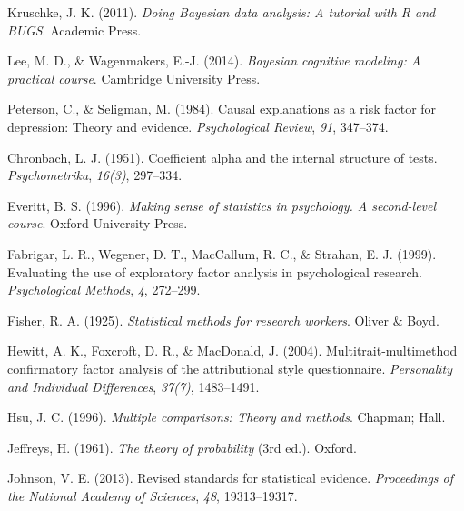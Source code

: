 \documentclass[
  a4paper,
]{book}
\newlength{\cslhangindent}
\newlength{\cslentryspacingunit} %
\newenvironment{CSLReferences}[2] %
 {%
  \setlength{\parindent}{0pt}
  \ifodd #1
  \let\oldpar\par
  \def\par{\hangindent=\cslhangindent\oldpar}
  \fi
  \setlength{\parskip}{#2\cslentryspacingunit}
 }%
 {}
\begin{document}
\begin{CSLReferences}{1}{0}
\leavevmode{}%
Kruschke, J. K. (2011). \emph{Doing {B}ayesian data analysis: A tutorial
with {R} and {BUGS}}. Academic Press.

\leavevmode{}%
Lee, M. D., \& Wagenmakers, E.-J. (2014). \emph{Bayesian cognitive
modeling: A practical course}. Cambridge University Press.

\leavevmode{}%
Peterson, C., \& Seligman, M. (1984). Causal explanations as a risk
factor for depression: Theory and evidence. \emph{Psychological Review},
\emph{91}, 347--374.

\end{CSLReferences}

\hypertarget{refs}{}
\begin{CSLReferences}{1}{0}
\leavevmode{}%
Chronbach, L. J. (1951). Coefficient alpha and the internal structure of
tests. \emph{Psychometrika}, \emph{16(3)}, 297--334.

\leavevmode{}%
Everitt, B. S. (1996). \emph{Making sense of statistics in psychology. A
second-level course}. Oxford University Press.

\leavevmode{}%
Fabrigar, L. R., Wegener, D. T., MacCallum, R. C., \& Strahan, E. J.
(1999). Evaluating the use of exploratory factor analysis in
psychological research. \emph{Psychological Methods}, \emph{4},
272--299.

\leavevmode{}%
Fisher, R. A. (1925). \emph{Statistical methods for research workers}.
Oliver \& Boyd.

\leavevmode{}%
Hewitt, A. K., Foxcroft, D. R., \& MacDonald, J. (2004).
Multitrait-multimethod confirmatory factor analysis of the attributional
style questionnaire. \emph{Personality and Individual Differences},
\emph{37(7)}, 1483--1491.

\leavevmode{}%
Hsu, J. C. (1996). \emph{Multiple comparisons: Theory and methods}.
Chapman; Hall.

\leavevmode{}%
Jeffreys, H. (1961). \emph{The theory of probability} (3rd ed.). Oxford.

\leavevmode{}%
Johnson, V. E. (2013). Revised standards for statistical evidence.
\emph{Proceedings of the National Academy of Sciences}, \emph{48},
19313--19317.


\end{CSLReferences}
\end{document}
